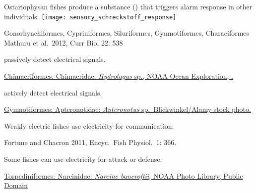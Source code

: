 \documentclass[t]{beamer}
\begin{document}
%

\begin{frame}[t]{Ostariophysan fishes produce a substance () that triggers alarm response in other individuals.}
\centering
\texttt{[image: sensory\_schreckstoff\_response]}

\vfilll

\tiny Gonorhynchiformes, Cypriniformes, Siluriformes, Gymnotiformes, Characiformes \hfill Mathuru et al.~2012, Curr Biol 22: 538
\end{frame}


%
{
\begin{frame}[t]{ passively detect electrical signals.}

\vfill

\tinyfill \href{ https://www.flickr.com/photos/27077560@N05/49203331708}{Chimaeriformes: Chimaeridae: \textit{Hydrolagus} sp., NOAA Ocean Exploration, .}

\end{frame}
}
%
{
\begin{frame}[t]{ actively detect electrical signals.}

\vfill

\tinyfill \textcolor{white}{ \href{https://www.science.org/content/article/how-ghost-knifefish-became-fastest-electrical-discharger-animal-kingdom}{Gymnotiformes: Apteronotidae: \textit{Apteronotus} sp. \textcopyright\,Blickwinkel/Alamy stock photo.}}

\end{frame}
}
%
{
\begin{frame}[t]{Weakly electric fishes use electricity for communication.}

\vfill

\tinyfill Fortune and Chacron 2011, Encyc.~Fish Physiol.~1: 366.

\end{frame}
}
%
{
\begin{frame}[t]{Some fishes can use electricity for attack or defense.}

\vfill

\tinyfill \href{https://commons.wikimedia.org/w/index.php?curid=17940959}{Torpediniformes: Narcinidae: \textit{Narcine bancroftii,} NOAA Photo Library, Public Domain}

\end{frame}
}
\end{document}
